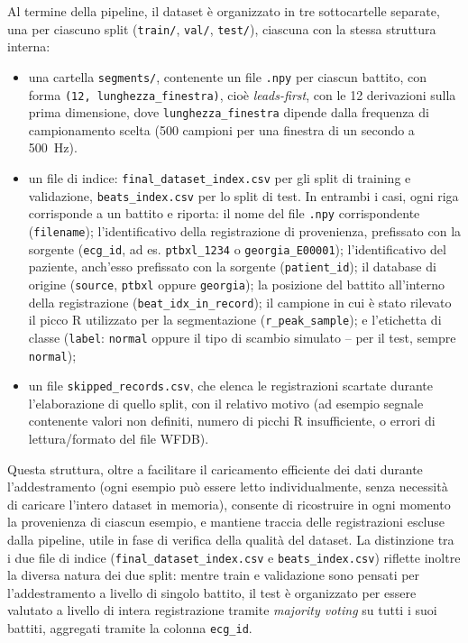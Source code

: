 Al termine della pipeline, il dataset è organizzato in tre sottocartelle separate, una per ciascuno split (\texttt{train/}, \texttt{val/}, \texttt{test/}), ciascuna con la stessa struttura interna:

\begin{itemize}
	\item una cartella \texttt{segments/}, contenente un file \texttt{.npy} per ciascun battito, con forma \texttt{(12, lunghezza\_finestra)}, cioè \emph{leads-first}, con le 12 derivazioni sulla prima dimensione, dove \texttt{lunghezza\_finestra} dipende dalla frequenza di campionamento scelta (500 campioni per una finestra di un secondo a \SI{500}{Hz}).
	\item un file di indice: \texttt{final\_dataset\_index.csv} per gli split di training e validazione, \texttt{beats\_index.csv} per lo split di test. In entrambi i casi, ogni riga corrisponde a un battito e riporta: il nome del file \texttt{.npy} corrispondente (\texttt{filename}); l'identificativo della registrazione di provenienza, prefissato con la sorgente (\texttt{ecg\_id}, ad es. \texttt{ptbxl\_1234} o \texttt{georgia\_E00001}); l'identificativo del paziente, anch'esso prefissato con la sorgente (\texttt{patient\_id}); il database di origine (\texttt{source}, \texttt{ptbxl} oppure \texttt{georgia}); la posizione del battito all'interno della registrazione (\texttt{beat\_idx\_in\_record}); il campione in cui è stato rilevato il picco R utilizzato per la segmentazione (\texttt{r\_peak\_sample}); e l'etichetta di classe (\texttt{label}: \texttt{normal} oppure il tipo di scambio simulato -- per il test, sempre \texttt{normal});
	\item un file \texttt{skipped\_records.csv}, che elenca le registrazioni scartate durante l'elaborazione di quello split, con il relativo motivo (ad esempio segnale contenente valori non definiti, numero di picchi R insufficiente, o errori di lettura/formato del file WFDB).
\end{itemize}

Questa struttura, oltre a facilitare il caricamento efficiente dei dati durante l'addestramento (ogni esempio può essere letto individualmente, senza necessità di caricare l'intero dataset in memoria), consente di ricostruire in ogni momento la provenienza di ciascun esempio, e mantiene traccia delle registrazioni escluse dalla pipeline, utile in fase di verifica della qualità del dataset. La distinzione tra i due file di indice (\texttt{final\_dataset\_index.csv} e \texttt{beats\_index.csv}) riflette inoltre la diversa natura dei due split: mentre train e validazione sono pensati per l'addestramento a livello di singolo battito, il test è organizzato per essere valutato a livello di intera registrazione tramite \emph{majority voting} su tutti i suoi battiti, aggregati tramite la colonna \texttt{ecg\_id}.

